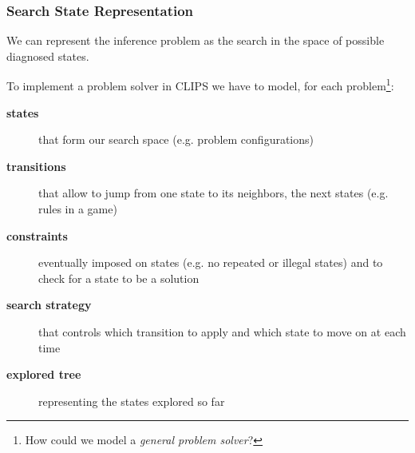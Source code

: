 \documentclass[xcolor={usenames,dvipsnames,svgnames}, compress]{beamer}
\begin{document}
\begin{frame}
  \frametitle{Search State Representation}
  We can represent the inference problem as the search in the space of
  possible diagnosed states.\par
  To implement a problem solver in CLIPS we have to model, for each
  problem\footnote{How could we model a \emph{general problem solver}?}:
  \begin{description}
  \item[\textbf{states}] that form our search space (e.g. problem configurations)
  \item[\textbf{transitions}] that allow to jump from one state to its
    neighbors, the next states (e.g. rules in a game)
  \item[\textbf{constraints}] eventually imposed on states (e.g. no
    repeated or illegal states) and to check for a state to be a solution
    \item[\textbf{search strategy}] that controls which transition to
      apply and which state to move on at each time
    \item[\textbf{explored tree}] representing the states explored so far
  \end{description}
\end{frame}
\end{document}
